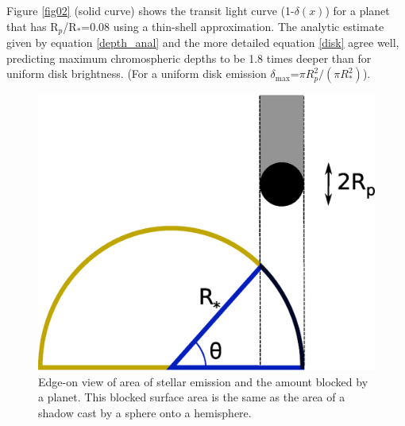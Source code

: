 \documentclass[manuscript]{aastex}
\newcommand{\p}{R$_p$/R$_*$}
\begin{document}

Figure \ref{fig02} (solid curve) shows the transit light curve (1-$\delta (x)$) for a planet that has \p =0.08 using a thin-shell approximation.  The analytic estimate given by equation \ref{depth_anal} and the more detailed equation \ref{disk} agree well, predicting maximum chromospheric depths to be 1.8 times
deeper than for uniform disk brightness. (For a uniform disk emission $\delta_{\mathrm{max}} $=$\pi R_p^2 /(\pi R_*^2)$). 



\begin{figure}
\begin{center}
\includegraphics[width=0.5 \textwidth]{chrom_shadow2.eps}
\caption{Edge-on view of area of stellar emission and the amount blocked by  a planet. This blocked surface area is the same as the area of a shadow cast by a sphere onto a hemisphere.}
\label{fig01}
\end{center}
\end{figure}
\end{document}
